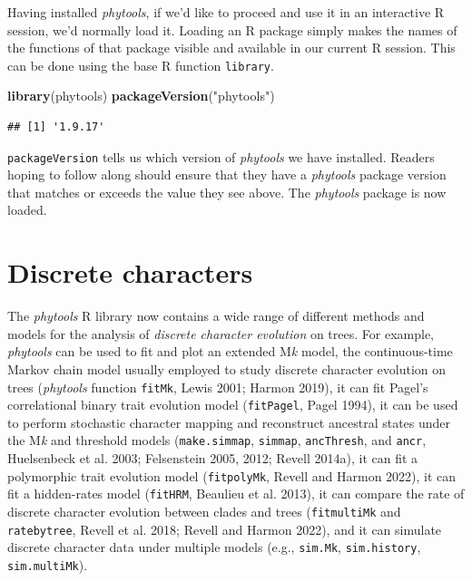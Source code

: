 \documentclass[fleqn,10pt,lineno]{wlpeerj} %
\newenvironment{Shaded}{\begin{snugshade}}{\end{snugshade}}
\newcommand{\FunctionTok}[1]{\textcolor[rgb]{0.13,0.29,0.53}{\textbf{#1}}}
\newcommand{\NormalTok}[1]{#1}
\newcommand{\StringTok}[1]{\textcolor[rgb]{0.31,0.60,0.02}{#1}}
\begin{document}
Having installed \emph{phytools}, if we'd like to proceed and use it in an interactive R session, we'd normally load it. Loading an R package simply makes the names of the functions of that package visible and available in our current R session. This can be done using the base R function \texttt{library}.

\begin{Shaded}
\begin{Highlighting}[]
\FunctionTok{library}\NormalTok{(phytools)}
\FunctionTok{packageVersion}\NormalTok{(}\StringTok{"phytools"}\NormalTok{)}
\end{Highlighting}
\end{Shaded}

\begin{verbatim}
## [1] '1.9.17'
\end{verbatim}

\texttt{packageVersion} tells us which version of \emph{phytools} we have installed. Readers hoping to follow along should ensure that they have a \emph{phytools} package version that matches or exceeds the value they see above. The \emph{phytools} package is now loaded.

\hypertarget{discrete-characters}{%
\section{Discrete characters}\label{discrete-characters}}

The \emph{phytools} R library now contains a wide range of different methods and models for the analysis of \emph{discrete character evolution} on trees. For example, \emph{phytools} can be used to fit and plot an extended M\emph{k} model, the continuous-time Markov chain model usually employed to study discrete character evolution on trees (\emph{phytools} function \texttt{fitMk}, Lewis 2001; Harmon 2019), it can fit Pagel's correlational binary trait evolution model (\texttt{fitPagel}, Pagel 1994), it can be used to perform stochastic character mapping and reconstruct ancestral states under the M\emph{k} and threshold models (\texttt{make.simmap}, \texttt{simmap}, \texttt{ancThresh}, and \texttt{ancr}, Huelsenbeck et al. 2003; Felsenstein 2005, 2012; Revell 2014a), it can fit a polymorphic trait evolution model (\texttt{fitpolyMk}, Revell and Harmon 2022), it can fit a hidden-rates model (\texttt{fitHRM}, Beaulieu et al. 2013), it can compare the rate of discrete character evolution between clades and trees (\texttt{fitmultiMk} and \texttt{ratebytree}, Revell et al. 2018; Revell and Harmon 2022), and it can simulate discrete character data under multiple models (e.g., \texttt{sim.Mk}, \texttt{sim.history}, \texttt{sim.multiMk}).
\end{document}
